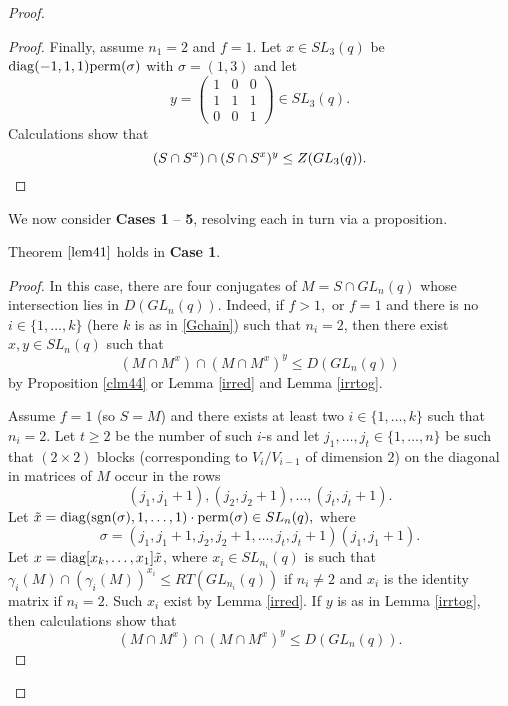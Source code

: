 \begin{proof}
\begin{proof}
Finally, assume $n_1=2$ and $f=1$. Let $x \in SL_3(q)$ be $\mathrm{diag}(-1,1, 1) \mathrm{perm}(\sigma)$ with $\sigma=(1,3)$ and let 
  \begin{equation*} 
y=  \begin{pmatrix}
1    & 0 & 0  \\
1 &1    & 1 \\
  0&    0    &   1      
\end{pmatrix} \in SL_3(q).
\end{equation*}
Calculations show that 
\begin{equation*} (S\cap S^x) \cap (S\cap S^x)^y \le Z(GL_3(q)).
 \qedhere
\end{equation*}
\end{proof} 

We now consider {\bf Cases 1} -- {\bf 5}, resolving each in turn via a proposition. 



\begin{Prop}
\label{case1prop}
Theorem $\ref{lem41}$ holds in {\bf Case 1}.
\end{Prop} 
\begin{proof}
In this case, there are four conjugates of $M=S \cap GL_n(q)$ whose intersection lies in $D(GL_n(q)).$ Indeed, if $f>1,$ or $f=1$ and there is no $i \in \{1, \ldots, k\}$ (here $k$ is as in \eqref{Gchain}) such that $n_i=2$, then 
 there exist $x,y \in SL_n(q)$ such that 
$$(M \cap M^x) \cap (M \cap M^x)^y \le D(GL_n(q))$$
by Proposition \ref{clm44}  or Lemma \ref{irred}  and Lemma \ref{irrtog}.


Assume $f=1$ (so $S=M$) and there exists at least two $i \in \{1, \ldots, k\}$ such that $n_i=2.$ Let $t\ge 2$ be the number of such $i$-s and let $j_1, \ldots, j_t \in \{1, \ldots, n\}$ be such that    $(2 \times 2)$ blocks (corresponding to $V_i/V_{i-1}$ of dimension $2$) on the diagonal in matrices of $M$ occur in the rows $$(j_1, j_1+1), (j_2, j_2 +1), \ldots, (j_t, j_t+1).$$ 
Let $\tilde{x}=\mathrm{diag}(\mathrm{sgn}(\sigma), 1, \ldots, 1) \cdot {\rm perm}(\sigma) \in SL_n(q),$ where  $$\sigma=(j_1, j_1+1, j_2, j_2 +1, \ldots, j_t, j_t+1)(j_1, j_1+1).$$  Let $x= \mathrm{diag}[x_k, \ldots, x_1]\tilde{x}$, where $x_i\in SL_{n_i}(q)$ is such that $\gamma_i(M) \cap (\gamma_i(M))^{x_i} \le RT(GL_{n_i}(q))$ if $n_i \ne 2$ and $x_i$ is the identity matrix if $n_i=2.$ Such $x_i$ exist by Lemma \ref{irred}. If $y$ is as in Lemma \ref{irrtog}, then calculations show that  
$$(M \cap M^x) \cap (M \cap M^x)^y \le D(GL_n(q)).$$









\end{proof}
\end{proof}
